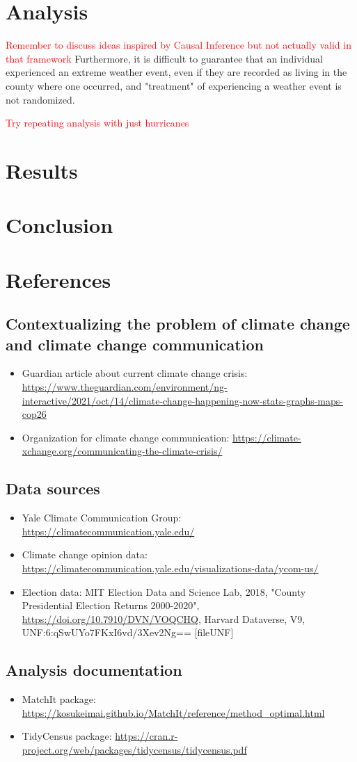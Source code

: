 \documentclass{article}
\begin{document}
\section{Analysis}

\textcolor{red}{Remember to discuss ideas inspired by Causal Inference but
not actually valid in that framework}
Furthermore, it is difficult to guarantee that an
individual experienced an extreme weather event, even if they are recorded
as living in the county where one occurred, and "treatment" of experiencing
a weather event is not randomized.

\textcolor{red}{Try repeating analysis with just hurricanes}

\section{Results}
\section{Conclusion}
\section{References}

\subsection{Contextualizing the problem of climate change and climate change communication}
\begin{itemize}
	\item Guardian article about current climate change crisis: \url{https://www.theguardian.com/environment/ng-interactive/2021/oct/14/climate-change-happening-now-stats-graphs-maps-cop26}
	\item Organization for climate change communication: \url{https://climate-xchange.org/communicating-the-climate-crisis/}
\end{itemize}

\subsection{Data sources}
\begin{itemize}
	\item Yale Climate Communication Group: \url{https://climatecommunication.yale.edu/}
	\item Climate change opinion data: \url{https://climatecommunication.yale.edu/visualizations-data/ycom-us/}
	\item Election data: MIT Election Data and Science Lab, 2018, "County Presidential Election Returns 2000-2020", \url{https://doi.org/10.7910/DVN/VOQCHQ}, Harvard Dataverse, V9, UNF:6:qSwUYo7FKxI6vd/3Xev2Ng== [fileUNF]
\end{itemize}

\subsection{Analysis documentation}
\begin{itemize}
	\item MatchIt package: \url{https://kosukeimai.github.io/MatchIt/reference/method_optimal.html}
	\item TidyCensus package: \url{https://cran.r-project.org/web/packages/tidycensus/tidycensus.pdf}
\end{itemize}
\end{document}
